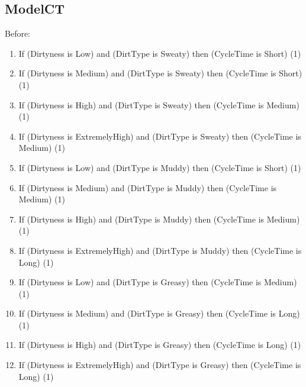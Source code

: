 \documentclass[11pt]{article}
\begin{document}
\begin{enumerate}[label=(\alph*)]
  \subsection*{ModelCT}

  Before:
  \begin{enumerate}[label=(\arabic*)]
    \item If (Dirtyness is Low) and (DirtType is Sweaty) then (CycleTime is
    Short) (1)
    \item If (Dirtyness is Medium) and (DirtType is Sweaty) then (CycleTime is
    Short) (1)
    \item If (Dirtyness is High) and (DirtType is Sweaty) then (CycleTime is
    Medium) (1)
    \item If (Dirtyness is ExtremelyHigh) and (DirtType is Sweaty) then
    (CycleTime is Medium) (1)
    \item If (Dirtyness is Low) and (DirtType is Muddy) then (CycleTime is
    Short) (1)
    \item If (Dirtyness is Medium) and (DirtType is Muddy) then (CycleTime is
    Medium) (1)
    \item If (Dirtyness is High) and (DirtType is Muddy) then (CycleTime is
    Medium) (1)
    \item If (Dirtyness is ExtremelyHigh) and (DirtType is Muddy) then
    (CycleTime is Long) (1)
    \item If (Dirtyness is Low) and (DirtType is Greasy) then (CycleTime is
    Medium) (1)
    \item If (Dirtyness is Medium) and (DirtType is Greasy) then (CycleTime is
    Long) (1)
    \item If (Dirtyness is High) and (DirtType is Greasy) then (CycleTime is
    Long) (1)
    \item If (Dirtyness is ExtremelyHigh) and (DirtType is Greasy) then
    (CycleTime is Long) (1)
  \end{enumerate}


\end{enumerate}
\end{document}
